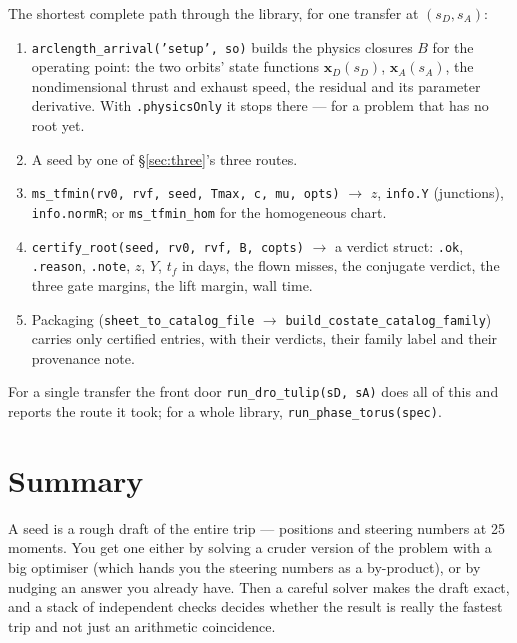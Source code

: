 \documentclass[11pt]{article}
\newcommand{\tf}{t_f}\newcommand{\R}{\mathbb{R}}
\newcommand{\file}[1]{\texttt{#1}}
\newcommand{\sD}{s_D}\newcommand{\sA}{s_A}
\begin{document}
\begin{rig}
The shortest complete path through the library, for one transfer at
$(\sD,\sA)$:
\begin{enumerate}[nosep]
\item \file{arclength\_arrival('setup', so)} builds the physics closures $B$
      for the operating point: the two orbits' state functions
      $\bm x_D(\sD)$, $\bm x_A(\sA)$, the nondimensional thrust and exhaust
      speed, the residual and its parameter derivative. With
      \file{.physicsOnly} it stops there --- for a problem that has no root
      yet.
\item A seed by one of \S\ref{sec:three}'s three routes.
\item \file{ms\_tfmin(rv0, rvf, seed, Tmax, c, mu, opts)} $\to$ $z$,
      \file{info.Y} (junctions), \file{info.normR}; or
      \file{ms\_tfmin\_hom} for the homogeneous chart.
\item \file{certify\_root(seed, rv0, rvf, B, copts)} $\to$ a verdict struct:
      \file{.ok}, \file{.reason}, \file{.note}, $z$, $Y$, $\tf$ in days, the
      flown misses, the conjugate verdict, the three gate margins, the lift
      margin, wall time.
\item Packaging (\file{sheet\_to\_catalog\_file} $\to$
      \file{build\_costate\_catalog\_family}) carries only certified entries,
      with their verdicts, their family label and their provenance note.
\end{enumerate}
For a single transfer the front door \file{run\_dro\_tulip(sD, sA)} does all
of this and reports the route it took; for a whole library,
\file{run\_phase\_torus(spec)}.
\end{rig}

\section{Summary}

\begin{eli}
A seed is a rough draft of the entire trip --- positions and steering numbers
at 25 moments. You get one either by solving a cruder version of the problem
with a big optimiser (which hands you the steering numbers as a by-product),
or by nudging an answer you already have. Then a careful solver makes the
draft exact, and a stack of independent checks decides whether the result is
really the fastest trip and not just an arithmetic coincidence.
\end{eli}
\end{document}
